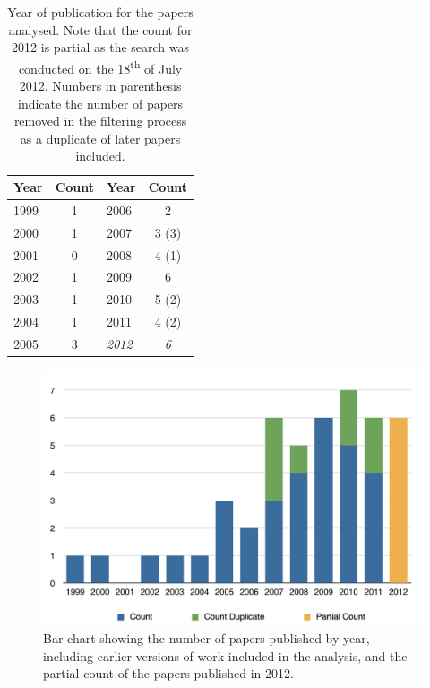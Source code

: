 \clearpage

\begin{table}[p]
	\centering
	\caption{Year of publication for the papers analysed. Note that the count for 2012 is partial as the search was conducted on the 18\textsuperscript{th} of July 2012. Numbers in parenthesis indicate the number of papers removed in the filtering process as a duplicate of later papers included. }
	\label{tbl:year}
	\footnotesize
    \begin{tabular}{lc||lc}
    \textbf{Year} & \textbf{Count} & \textbf{Year} & \textbf{Count} \\ \hline
		1999	&	1	& 		2006	&	2		\\
		2000	&	1	& 		2007	&	3 (3)	\\
		2001	&	0	& 		2008	&	4 (1)	\\
		2002	&	1	& 		2009	&	6		\\
		2003	&	1	& 		2010	&	5 (2)	\\
		2004	&	1	& 		2011	&	4 (2)	\\
		2005	&	3	& 		\emph{2012}	&	\emph{6}	\\
    \end{tabular}
\end{table}

\begin{figure}[p]
	\centering
	\includegraphics[width=\textwidth]{Year}
	\caption{Bar chart showing the number of papers published by year, including earlier versions of work included in the analysis, and the partial count of the papers published in 2012.}
	\label{fig:year}
\end{figure}


\clearpage
